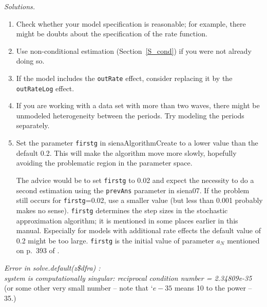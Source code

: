 \documentclass[a4paper,fleqn,11pt]{article}
\newcommand{\+}{\, + \,}
\newcommand{\sfn}[1]{\textsf{#1}}
\begin{document}
{\begin{minipage}{0.94\textwidth}
\noindent
\emph{Solutions.}
\begin{enumerate}
\item Check whether your model specification is reasonable;
    for example, there might be doubts about the specification of the
    rate function.
\item  Use non-conditional estimation (Section~\ref{S_cond}) if you were not
   already doing so.
\item If the model includes the \texttt{outRate} effect, consider
    replacing it by the \texttt{outRateLog} effect.
\item If you are working with a data set with more than two waves, there might
   be unmodeled heterogeneity between the periods. Try modeling the periods
   separately.
\item Set the parameter \texttt{firstg} in \sfn{sienaAlgorithmCreate} to a
   lower value than the default 0.2.
   This will make the algorithm move more slowly, hopefully avoiding the problematic region
   in the parameter space.

   The advice would be to set  \texttt{firstg}  to 0.02
   and expect the necessity to do a second estimation using the \texttt{prevAns}
   parameter in \sfn{siena07}. If the problem still occurs for \texttt{firstg}=0.02,
   use a smaller value (but less than 0.001 probably makes no sense).
   \texttt{firstg} determines the step sizes in the stochastic approximation
   algorithm; it is mentioned in some places earlier in this manual.
   Especially for models with additional rate effects the default value of 0.2
   might be too large.
    \texttt{firstg}  is the initial value of parameter $a_N$ mentioned
    on p.\ 393 of \citet{Snijders01}.
\end{enumerate}
\end{minipage}
\bigskip

\noindent
\emph{Error in solve.default(z\$dfra) : \\
system is computationally singular: reciprocal condition number = 2.34809e-35
}\\
(or some other very small number -- note that `$e-35$ means 10 to the power
--35.)
\smallskip

}
\end{document}

